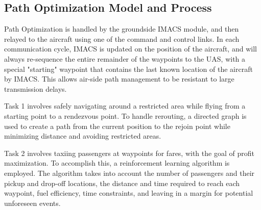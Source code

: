 \clearpage 

\subsection{Path Optimization Model and Process}
\label{sec:path-optimization}

Path Optimization is handled by the groundside IMACS module, and then relayed
to the aircraft using one of the command and control links. In each
communication cycle, IMACS is updated on the position of the aircraft, and will
always re-sequence the entire remainder of the waypoints to the UAS, with a
special "starting" waypoint that contains the last known location of the
aircraft by IMACS. This allows air-side path management to be resistant to
large transmission delays.

Task 1 involves safely navigating around a restricted area while flying from a
starting point to a rendezvous point. To handle rerouting, a directed graph is
used to create a path from the current position to the rejoin point while
minimizing distance and avoiding restricted areas.

Task 2 involves taxiing passengers at waypoints for fares, with the goal of
profit maximization. To accomplish this, a reinforcement learning algorithm is
employed. The algorithm takes into account the number of passengers and their
pickup and drop-off locations, the distance and time required to reach each
waypoint,  fuel efficiency, time constraints, and leaving in a margin for
potential unforeseen events.
